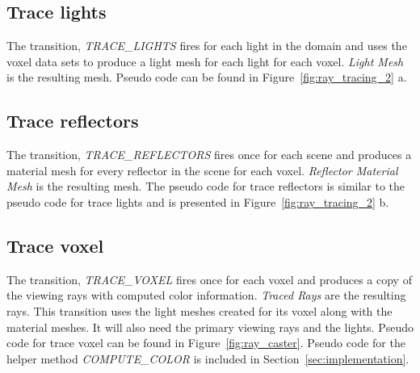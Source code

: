 \subsection{Trace lights}
The transition, \emph{TRACE\_LIGHTS} fires for each light in the domain and
uses the voxel data sets to produce a light mesh for each light for each
voxel.  \emph{Light Mesh} is the resulting mesh.  Pseudo code can be found in 
Figure~\ref{fig:ray_tracing_2} a.

\subsection{Trace reflectors}
The transition, \emph{TRACE\_REFLECTORS} fires once for each scene and produces a
material mesh for every reflector in the scene for each voxel.  \emph{Reflector
Material Mesh} is the resulting mesh.  The pseudo code for trace reflectors is
similar to the pseudo code for trace lights and is presented in
 Figure~\ref{fig:ray_tracing_2} b.

\subsection{Trace voxel}
The transition, \emph{TRACE\_VOXEL} fires once for each voxel and produces a 
copy of the viewing rays with computed color information.  \emph{Traced Rays} 
are the resulting rays.  This transition uses the light meshes created for 
its voxel along with the material meshes.  It will also need the primary viewing 
rays and the lights.  Pseudo code for trace voxel can be found in 
Figure~\ref{fig:ray_caster}.  Pseudo code for the helper method 
\emph{COMPUTE\_COLOR} is included in Section~\ref{sec:implementation}.


